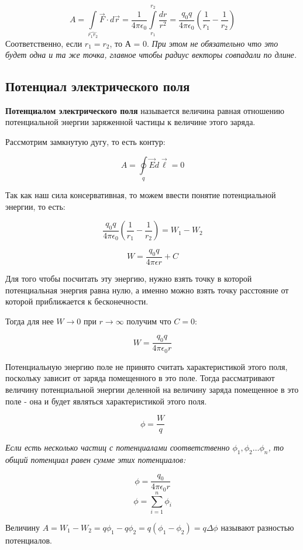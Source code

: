 \documentclass[../main.tex]{subfiles}
\begin{document}
\[ A = \int\limits_{\hat{r_1 r_2}} \vec{F} \cdot d\vec{r} = \frac{1}{4 \pi \epsilon_0} \int\limits_{r_1}^{r_2} \frac{dr}{r^2} = \frac{q_0 q}{4 \pi \epsilon_0} \left(\frac{1}{r_1} - \frac{1}{r_2}\right) \]
Соответственно, если $r_1 = r_2$, то А = 0.
\textit{При этом не обязательно что это будет одна и та же точка, главное чтобы радиус векторы совпадали по длине.}

\subsection{Потенциал электрического поля}
 \textbf{Потенциалом электрического поля} называется величина равная отношению потенциальной энергии заряженной частицы к величине этого заряда.

Рассмотрим замкнутую дугу, то есть контур:

\[A = \oint\limits_q \vec{E} d\vec{\ell} = 0\]

Так как наш сила консервативная, то можем ввести понятие потенциальной энергии, то есть:

\[\frac{q_0 q}{4 \pi \epsilon_0} \left(\frac{1}{r_1} - \frac{1}{r_2}\right) = W_1 - W_2\]

\[W = \frac{q_0 q}{4 \pi \epsilon r} + C\]

Для того чтобы посчитать эту энергию, нужно взять точку в которой потенциальная энергия равна нулю, а именно можно взять точку расстояние от которой приближается к бесконечности.

\vspace{5px}

Тогда для нее $W \to 0$ при $r \to \infty$ получим что $C = 0$:

\[W = \frac{q_0 q}{4 \pi \epsilon_0 r}\]

Потенциальную энергию поле не принято считать характеристикой этого поля, поскольку зависит от заряда помещенного в это поле. 
Тогда рассматривают величину потенциальной энергии деленной на величину заряда помещенное в это поле - она и будет являться характеристикой этого поля.

\[\phi = \frac{W}{q}\]

\textit{Если есть несколько частиц с потенциалами соответственно $\phi_1, \phi_2 \ldots \phi_n$, то общий потенциал равен сумме этих потенциалов:}

\[\phi = \frac{q_0}{4 \pi \epsilon_0 r} \]
\[\phi = \sum_{i = 1}^{n} \phi_i  \]

 Величину $A = W_1 - W_2 = q\phi_1 - q\phi_2 = q(\phi_1 - \phi_2) = q\Delta \phi$ называют разностью потенциалов.
\end{document}

